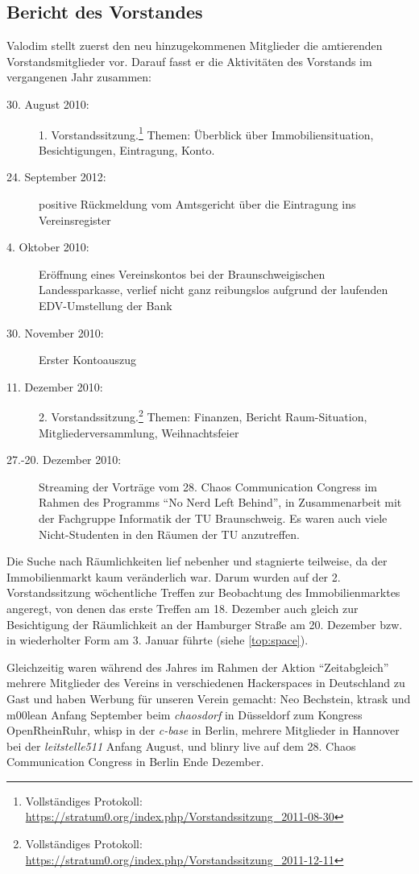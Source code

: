 \documentclass[a4paper,12pt]{scrartcl}
\begin{document}
\subsection{Bericht des Vorstandes}
Valodim stellt zuerst den neu hinzugekommenen Mitglieder die amtierenden
Vorstandsmitglieder vor. Darauf fasst er die Aktivitäten des Vorstands im
vergangenen Jahr zusammen:
\begin{description}
  \item[30. August 2010:] 1. Vorstandssitzung.\footnote{Vollständiges Protokoll:
    \url{https://stratum0.org/index.php/Vorstandssitzung\_2011-08-30}}
    Themen: Überblick über Immobiliensituation, Besichtigungen, Eintragung,
    Konto.
  \item[24. September 2012:] positive Rückmeldung vom Amtsgericht über die
    Eintragung ins Vereinsregister
  \item[4. Oktober 2010:] Eröffnung eines Vereinskontos bei der
    Braunschweigischen Landessparkasse, verlief nicht ganz reibungslos aufgrund
    der laufenden EDV-Umstellung der Bank
  \item[30. November 2010:] Erster Kontoauszug
  \item[11. Dezember 2010:] 2. Vorstandssitzung.\footnote{Vollständiges
    Protokoll:
    \url{https://stratum0.org/index.php/Vorstandssitzung\_2011-12-11}}
    Themen: Finanzen, Bericht Raum-Situation, Mitgliederversammlung,
    Weihnachtsfeier
  \item[27.-20. Dezember 2010:] Streaming der Vorträge vom 28. Chaos
    Communication Congress im Rahmen des Programms "`No Nerd Left Behind"', in
    Zusammenarbeit mit der Fachgruppe Informatik der TU Braunschweig. Es waren
    auch viele Nicht-Studenten in den Räumen der TU anzutreffen.
\end{description}

Die Suche nach Räumlichkeiten lief nebenher und stagnierte teilweise, da der
Immobilienmarkt kaum veränderlich war. Darum wurden auf der 2. Vorstandssitzung
wöchentliche Treffen zur Beobachtung des Immobilienmarktes angeregt, von denen
das erste Treffen am 18. Dezember auch gleich zur Besichtigung der Räumlichkeit
an der Hamburger Straße am 20. Dezember bzw. in wiederholter Form am 3. Januar
führte (siehe \ref{top:space}).

Gleichzeitig waren während des Jahres im Rahmen der Aktion "`Zeitabgleich"'
mehrere Mitglieder des Vereins in verschiedenen Hackerspaces in Deutschland zu
Gast und haben Werbung für unseren Verein gemacht: Neo Bechstein, ktrask und
m00lean Anfang September beim \emph{chaosdorf} in Düsseldorf zum Kongress
OpenRheinRuhr, whisp in der \emph{c-base} in Berlin, mehrere Mitglieder in
Hannover bei der \emph{leitstelle511} Anfang August, und blinry live auf dem
28. Chaos Communication Congress in Berlin Ende Dezember.
\end{document}
